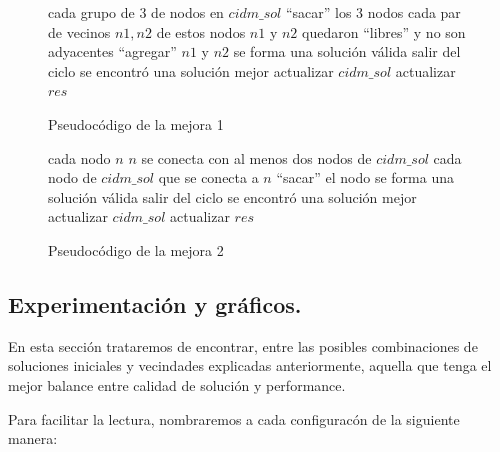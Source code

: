 \begin{figure}
\begin{codebox}
\li \For cada grupo de 3 de nodos en $cidm\_sol$
\li \Do 
		``sacar'' los 3 nodos
\li 		\For cada par de vecinos $n1,n2$ de estos nodos
\li 		\Do 
			\If $n1$ y $n2$ quedaron ``libres'' y no son adyacentes
\li			\Then
				``agregar'' $n1$ y $n2$
\li 				\If se forma una solución válida
\li 				\Then salir del ciclo
				\End
			\End
		\End
\li 		\If se encontró una solución mejor
\li 		\Then
			actualizar $cidm\_sol$
\li 			actualizar $res$
\li 			\Return
		\End
	\End
\li \Return
\end{codebox}
\caption{Pseudocódigo de la mejora 1}\label{code:mej1}
\end{figure}



\begin{figure}
\begin{codebox}
\li \For cada nodo $n$
\li \Do 
		\If $n$ se conecta con al menos dos nodos de $cidm\_sol$
\li 		\Then 
			\For cada nodo de $cidm\_sol$ que se conecta a $n$
\li 			\Do 
				``sacar'' el nodo
\li 				\If se forma una solución válida
\li 				\Then salir del ciclo
				\End
			\End
\li 			\If se encontró una solución mejor
\li 			\Then
				actualizar $cidm\_sol$
\li 				actualizar $res$
\li 				\Return
			\End
		\End
	\End
\li \Return
\end{codebox}
\caption{Pseudocódigo de la mejora 2}\label{code:mej2}
\end{figure}


\vspace*{0.6cm}
\newpage
\subsection{Experimentación y gráficos.}

\vspace*{0.3cm}

En esta sección trataremos de encontrar, entre las posibles combinaciones de soluciones iniciales y vecindades explicadas anteriormente, aquella que tenga el mejor balance entre calidad de solución y performance. 

Para facilitar la lectura, nombraremos a cada configuracón de la siguiente manera:

